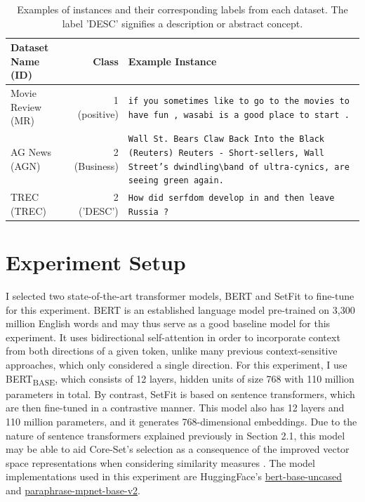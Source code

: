 \documentclass[english,bachelor,ul]{webisthesis} %
\begin{document}
\vspace{1\baselineskip}

\begin{table}[htbp]
    \centering
    \renewcommand{\arraystretch}{1.5}
    \begin{tabular}{@{}lrp{7cm}@{}} 
        \toprule
        \textbf{Dataset Name} \scriptsize (ID) & \textbf{Class} & \textbf{Example Instance} \\
        \midrule
        Movie Review \scriptsize (MR) & 1 (positive) & \texttt{if you sometimes like to go to the movies to have fun , wasabi is a good place to start .} \\
        AG News \scriptsize (AGN) & 2  (Business) & \texttt{Wall St. Bears Claw Back Into the Black (Reuters) Reuters - Short-sellers, Wall Street's dwindling\textbackslash band of ultra-cynics, are seeing green again.} \\
        TREC \scriptsize (TREC) & 2 ('DESC') & \texttt{How did serfdom develop in and then leave Russia ?} \\
        \bottomrule
    \end{tabular}
    \caption{Examples of instances and their corresponding labels from each dataset. The label 'DESC' signifies a description or abstract concept.}
    \label{tab:dataset-instances}
\end{table}

\newpage 

\section{Experiment Setup}

I selected two state-of-the-art transformer models, BERT \citep{DBLP:conf/naacl/DevlinCLT19} and SetFit \citep{DBLP:setfit} to fine-tune for this experiment. BERT is an established language model pre-trained on 3,300 million English words and may thus serve as a good baseline model for this experiment. It uses bidirectional self-attention in order to incorporate context from both directions of a given token, unlike many previous context-sensitive approaches, which only considered a single direction. For this experiment, I use BERT\textsubscript{BASE}, which consists of 12 layers, hidden units of size 768 with 110 million parameters in total. By contrast, SetFit is based on sentence transformers, which are then fine-tuned in a contrastive manner. This model also has 12 layers and 110 million parameters, and it generates 768-dimensional embeddings. Due to the nature of sentence transformers explained previously in Section 2.1, this model may be able to aid Core-Set's selection as a consequence of the improved vector space representations when considering similarity measures \citep{DBLP:conf/emnlp/ReimersG19}. The model implementations used in this experiment are HuggingFace's \href{https://huggingface.co/google-bert/bert-base-uncased}{bert-base-uncased} and \href{https://huggingface.co/sentence-transformers/paraphrase-mpnet-base-v2}{
paraphrase-mpnet-base-v2}.
\end{document}

